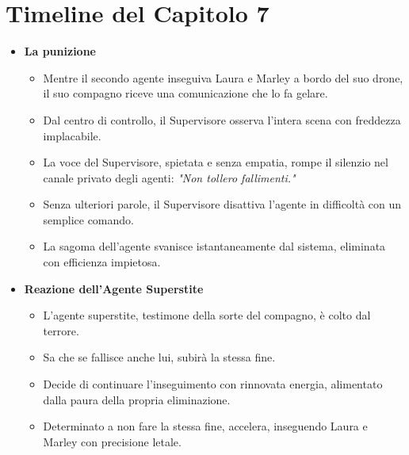 \section*{Timeline del Capitolo 7}
\begin{itemize}
\item \textbf{La punizione}
  \begin{itemize}
        \item Mentre il secondo agente inseguiva Laura e Marley a bordo del suo drone, il suo compagno riceve una comunicazione che lo fa gelare.
        \item Dal centro di controllo, il Supervisore osserva l'intera scena con freddezza implacabile.
        \item La voce del Supervisore, spietata e senza empatia, rompe il silenzio nel canale privato degli agenti: \emph{"Non tollero fallimenti."}
        \item Senza ulteriori parole, il Supervisore disattiva l'agente in difficoltà con un semplice comando.
        \item La sagoma dell'agente svanisce istantaneamente dal sistema, eliminata con efficienza impietosa.
    \end{itemize}
    
    \item \textbf{Reazione dell'Agente Superstite}
    \begin{itemize}
        \item L'agente superstite, testimone della sorte del compagno, è colto dal terrore.
        \item Sa che se fallisce anche lui, subirà la stessa fine.
        \item Decide di continuare l'inseguimento con rinnovata energia, alimentato dalla paura della propria eliminazione.
        \item Determinato a non fare la stessa fine, accelera, inseguendo Laura e Marley con precisione letale.
    \end{itemize}
\end{itemize}


